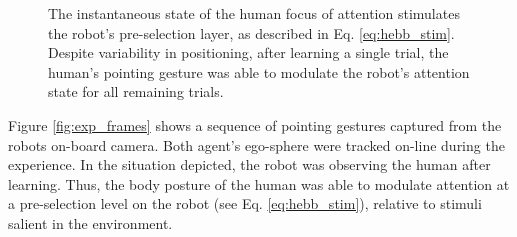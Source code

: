 \documentclass[letterpaper, 10 pt, conference]{ieeeconf}  %
\begin{document}
\begin{figure}[h!]
\begin{center}
	\end{center}
	\caption{The instantaneous state of the human focus of attention stimulates the robot's pre-selection layer, as described in Eq. \eqref{eq:hebb_stim}. Despite variability in positioning, after learning a single trial, the human's pointing gesture was able to modulate the robot's attention state for all remaining trials.}
	\label{fig:exp_hebb}
\end{figure}

Figure \ref{fig:exp_frames} shows a sequence of pointing gestures captured from the robots on-board camera. Both agent's ego-sphere were tracked on-line during the experience. In the situation depicted, the robot was observing the human after learning. Thus, the body posture of the human was able to modulate attention at a pre-selection level on the robot (see Eq. \eqref{eq:hebb_stim}), relative to stimuli salient in the environment. 
\end{document}
